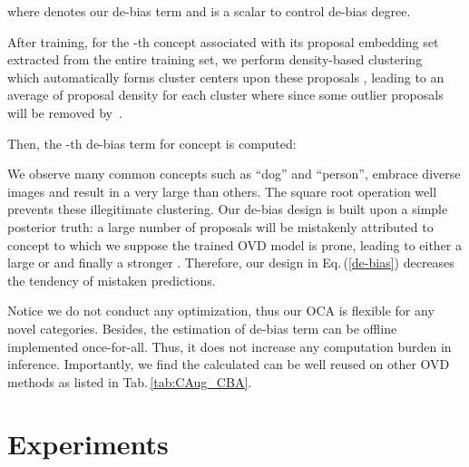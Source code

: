 \documentclass[10pt,twocolumn,letterpaper]{article}
\begin{document}
where  denotes our de-bias term and  is a scalar to control de-bias degree.


After training, for the -th concept  associated with its proposal embedding set  extracted from the entire training set, we perform density-based clustering~\cite{rodriguez2014clustering} which automatically forms  cluster centers upon these proposals , leading to an average of  proposal density for each cluster where  since some outlier proposals will be removed by~\cite{rodriguez2014clustering}. 


Then, the -th de-bias term  for concept  is computed:



We observe many common concepts such as ``dog'' and ``person'', embrace diverse images and result in a very large  than others. The square root operation well prevents these illegitimate clustering. Our de-bias design is built upon a simple posterior truth:
a large number of proposals will be mistakenly attributed to concept  to which we suppose the trained OVD model is prone, leading to either a large  or  and finally a stronger  . Therefore, our design in Eq.\,(\ref{de-bias}) decreases the tendency of mistaken predictions.





Notice we do not conduct any optimization, thus our OCA is flexible for any novel categories. Besides, the estimation of de-bias term  can be offline implemented once-for-all. Thus, it does not increase any computation burden in inference. Importantly, we find the calculated  can be well reused on other OVD methods as listed in Tab.\,\ref{tab:CAug_CBA}.


















%
 





\section{Experiments}
\label{sec:experiments}
\end{document}
